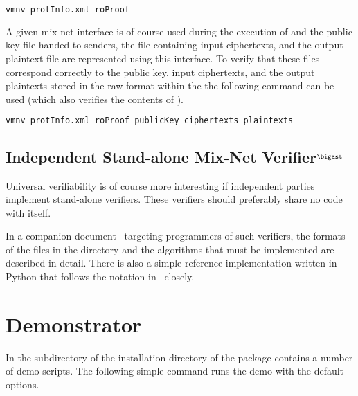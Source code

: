 \documentclass[11pt]{article}
\newcommand{\MARK}{$^\bigast$}
\begin{document}
\vspace{0.3cm}
\begin{lstlisting}[frame=single,language=xml,
basicstyle=\tt,showstringspaces=false]
vmnv protInfo.xml roProof
\end{lstlisting}

\vspace{0.2cm}
\noindent
A given mix-net interface is of course used during the execution of
\vmn{} and the public key file  handed to senders, the
file  containing input ciphertexts, and the output
plaintext file  are represented using this
interface. To verify that these files correspond correctly to the
public key, input ciphertexts, and the output plaintexts stored in the
raw format within the  the following command can be
used (which also verifies the contents of ).

\vspace{0.3cm}
\begin{lstlisting}[frame=single,language=xml,
basicstyle=\tt,showstringspaces=false]
vmnv protInfo.xml roProof publicKey ciphertexts plaintexts
\end{lstlisting}

\vspace{0.2cm}
\noindent

\subsection{Independent Stand-alone Mix-Net Verifier\MARK}

Universal verifiability is of course more interesting if independent
parties implement stand-alone verifiers. These verifiers should
preferably share no code with \veri itself.

In a companion document~\cite{vmnv} targeting programmers of such
verifiers, the formats of the files in the  directory
and the algorithms that must be implemented are described in
detail. There is also a simple reference implementation written in
Python\cite{pvmnv} that follows the notation in~\cite{vmnv} closely.


\section{Demonstrator}

In the  subdirectory of the installation directory
of the \veri package contains a number of demo scripts. The following
simple command runs the demo with the default options.
\end{document}
